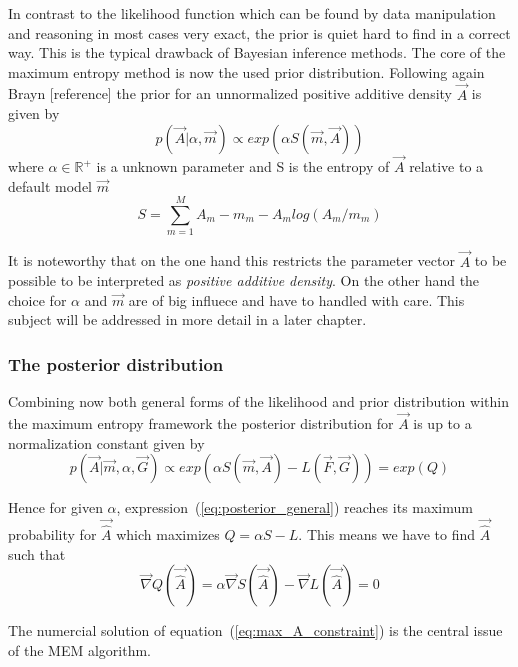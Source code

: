 In contrast to the likelihood function which can be found by data manipulation and reasoning in most cases very exact, the 
prior is quiet hard to find in a correct way. This is the typical drawback of Bayesian inference methods.
The core of the maximum entropy method is now the used prior distribution. Following again Brayn [reference] the prior for 
an unnormalized positive additive density $\vec{A}$ is given by
\begin{displaymath}
 p(\vec{A}| \alpha, \vec{m}) \propto exp(\alpha S(\vec{m},\vec{A}))
\end{displaymath}
where $\alpha \in \mathbb{R}^+$ is a unknown parameter and S is the entropy of $\vec{A}$ relative to a default model $\vec{m}$
\begin{displaymath}
 S = \sum_{m=1}^{M} A_m -m_m -A_m log(A_m/m_m)
\end{displaymath}

\noindent It is noteworthy that on the one hand this restricts the parameter vector $\vec{A}$ to be possible to be interpreted as 
\textit{positive additive density}. On the other hand the choice for $\alpha$ and $\vec{m}$ are of big influece and have to 
handled with care. This subject will be addressed in more detail in a later chapter. 

\subsubsection{The posterior distribution}

\noindent Combining now both general forms of the likelihood and prior distribution within the maximum entropy framework the posterior 
distribution for $\vec{A}$ is up to a normalization constant given by 
\begin{equation}\label{eq:posterior_general}
 p(\vec{A}|\vec{m},\alpha,\vec{G}) \propto exp(\alpha S(\vec{m},\vec{A}) - L(\vec{F},\vec{G})) = exp(Q)
\end{equation}


\noindent Hence for given $\alpha$, expression~(\ref{eq:posterior_general}) reaches its maximum probability for $\vec{\hat{A}}$
which maximizes $Q = \alpha S - L$. This means we have to find $\vec{\hat{A}}$ such that
\begin{equation}\label{eq:max_A_constraint}
 \vec{\nabla} Q(\vec{\hat{A}}) = \alpha \vec{\nabla} S(\vec{\hat{A}}) - \vec{\nabla} L(\vec{\hat{A}}) = 0
\end{equation}

\noindent The numercial solution of equation~(\ref{eq:max_A_constraint}) is the central issue of the MEM algorithm. 

